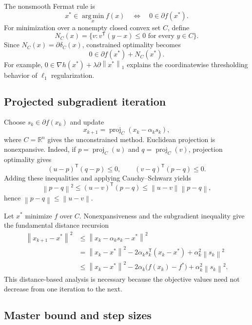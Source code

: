 \documentclass[12pt,oneside]{book}
\numberwithin{equation}{section}
\theoremstyle{definition}
\theoremstyle{plain}
\theoremstyle{remark}
\newcommand{\R}{\mathbb{R}}
\newcommand{\argmin}{\operatorname*{arg\,min}}
\newcommand{\norm}[1]{\left\lVert #1 \right\rVert}
\begin{document}
The nonsmooth Fermat rule is
\[
 x^*\in\argmin_x f(x)\quad\Longleftrightarrow\quad0\in\partial f(x^*).
\]
For minimization over a nonempty closed convex set $C$, define
\[
 N_C(x)=\{v:v^\mathsf T(y-x)\leq0\text{ for every }y\in C\}.
\]
Since $N_C(x)=\partial\delta_C(x)$, constrained optimality becomes
\[
 0\in\partial f(x^*)+N_C(x^*).
\]
For example, $0\in\nabla h(x^*)+\lambda\partial\norm{x^*}_1$ explains the
coordinatewise thresholding behavior of $\ell_1$ regularization.

\subsection{Projected subgradient iteration}

Choose $s_k\in\partial f(x_k)$ and update
\[
 x_{k+1}=\operatorname{proj}_C(x_k-\alpha_ks_k),
\]
where $C=\R^n$ gives the unconstrained method. Euclidean projection is
nonexpansive. Indeed, if $p=\operatorname{proj}_C(u)$ and
$q=\operatorname{proj}_C(v)$, projection
optimality gives
\[
 (u-p)^\mathsf T(q-p)\leq0,
 \qquad (v-q)^\mathsf T(p-q)\leq0.
\]
Adding these inequalities and applying Cauchy--Schwarz yields
\[
 \norm{p-q}^2\leq(u-v)^\mathsf T(p-q)
 \leq\norm{u-v}\norm{p-q},
\]
hence $\norm{p-q}\leq\norm{u-v}$.

Let $x^*$ minimize $f$ over $C$. Nonexpansiveness and the subgradient
inequality give the fundamental distance recursion
\begin{align*}
 \norm{x_{k+1}-x^*}^2
 &\leq\norm{x_k-\alpha_ks_k-x^*}^2\\
 &=\norm{x_k-x^*}^2-2\alpha_ks_k^\mathsf T(x_k-x^*)
       +\alpha_k^2\norm{s_k}^2\\
 &\leq\norm{x_k-x^*}^2-2\alpha_k\bigl(f(x_k)-f^*\bigr)
       +\alpha_k^2\norm{s_k}^2.
\end{align*}
This distance-based analysis is necessary because the objective values need
not decrease from one iteration to the next.

\subsection{Master bound and step sizes}
\end{document}
